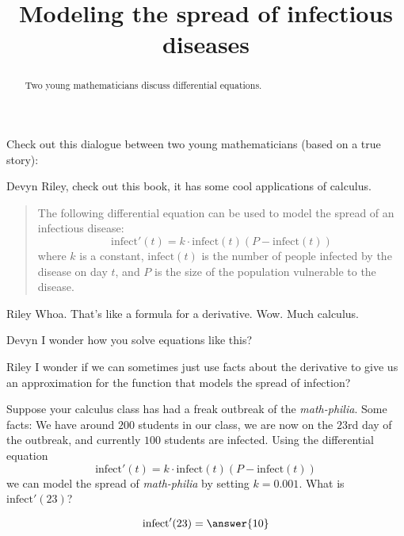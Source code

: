 \documentclass{ximera}
\title[Break-Ground:]{Modeling the spread of infectious diseases}
\begin{document}
\begin{abstract}
  Two young mathematicians discuss differential equations.
\end{abstract}
\maketitle







Check out this dialogue between two young mathematicians (based on a true
story):

\begin{dialogue}
\item[Devyn] Riley, check out this book, it has some cool applications
  of calculus.
\begin{quote}
  The following differential equation can be used to model the spread
  of an infectious disease:
  \[
  \mathrm{infect}'(t) = k\cdot \mathrm{infect}(t)(P-\mathrm{infect}(t))
  \]
  where $k$ is a constant, $\mathrm{infect}(t)$ is the number of people
  infected by the disease on day $t$, and $P$ is the size of the
  population vulnerable to the disease.
\end{quote}
\item[Riley] Whoa. That's like a formula for a derivative. Wow. Much calculus. 
\item[Devyn] I wonder how you solve equations like this?
\item[Riley] I wonder if we can sometimes just use facts about the
  derivative to give us an approximation for the function that models the spread of infection?
\end{dialogue}



\begin{problem}
  Suppose your calculus class has had a freak outbreak of the
  \textit{math-philia}. Some facts: We have around $200$ students in
  our class, we are now on the $23$rd day of the outbreak, and currently $100$ students are infected. Using the differential
  equation
  \[
  \mathrm{infect}'(t) = k\cdot \mathrm{infect}(t)(P-\mathrm{infect}(t))
  \]
  we can model the spread of \textit{math-philia} by setting $k=0.001$.
  What is $\mathrm{infect}'(23)$?
  \begin{prompt}
    \[
    \mathrm{infect}'(23) = \answer{10}
    \]
  \end{prompt}
\end{problem}
\end{document}
